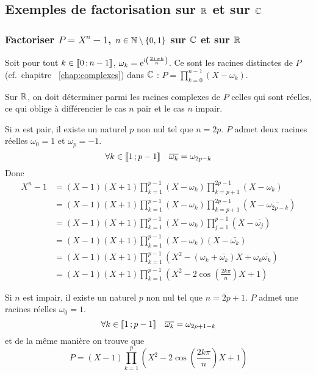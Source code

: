 \subsection{Exemples de factorisation sur \(\mathbb{R}\) et sur \(\mathbb{C}\)}

\subsubsection{Factoriser \(P=X^n-1\), \(n \in \mathbb{N}\setminus\{0,1\}\) sur \(\mathbb{C}\) et sur \(\mathbb{R}\)}

Soit pour tout \(k \in \mathopen{\llbracket}0\mathclose{}\mathpunct{};n-1\mathclose{\rrbracket}\), \(\omega_k = \operatorname{e}^{\operatorname{i}\left(\frac{2\operatorname{i} \pi k}{n}\right)}\). Ce sont les racines distinctes de \(P\) (cf.\ chapitre~
\ref{chap:complexes}) dans \(\mathbb{C}\) : \(P = \prod_{k=0}^{n-1}(X-\omega_k)\).

Sur \(\mathbb{R}\), on doit déterminer parmi les racines complexes de \(P\) celles qui sont réelles, ce qui oblige à différencier le cas \(n\) pair et le cas \(n\) impair.

Si \(n\) est pair, il existe un naturel \(p\) non nul tel que \(n=2p\). \(P\) admet deux racines réelles \(\omega_0=1\) et \(\omega_p=-1\).
\begin{equation}
  \forall k \in \mathopen{\llbracket}1\mathclose{}\mathpunct{};p-1\mathclose{\rrbracket} \quad \overline{\omega_k}=\omega_{2p-k}
\end{equation}
Donc
\begin{align}
  X^n-1 &= (X-1)(X+1) \prod_{k=1}^{p-1} (X-\omega_k)\prod_{k=p+1}^{2p-1} (X-\omega_k) \\
  &=(X-1)(X+1) \prod_{k=1}^{p-1} (X-\omega_k) \prod_{k=p+1}^{2p-1} (X-\bar{\omega_{2p-k}})\\
  &=(X-1)(X+1) \prod_{k=1}^{p-1} (X-\omega_k) \prod_{j=1}^{p-1} (X-\bar{\omega_{j}})\\
  &=(X-1)(X+1) \prod_{k=1}^{p-1} (X-\omega_k)(X-\bar{\omega_{k}})\\
  &=(X-1)(X+1) \prod_{k=1}^{p-1} (X^2-(\omega_k+\bar{\omega_k})X+\omega_k\bar{\omega_k})\\
  &=(X-1)(X+1) \prod_{k=1}^{p-1} \left(X^2-2\cos\left(\frac{2k\pi}{n}\right)X+1\right)
\end{align}

Si \(n\) est impair, il existe un naturel \(p\) non nul tel que \(n=2p+1\). \(P\) admet une racines réelles \(\omega_0=1\).
\begin{equation}
  \forall k \in \mathopen{\llbracket}1\mathclose{}\mathpunct{};p-1\mathclose{\rrbracket} \quad \overline{\omega_k}=\omega_{2p+1-k}
\end{equation}
et de la même manière on trouve que
\begin{equation}
  P=(X-1) \prod_{k=1}^{p} \left(X^2-2\cos\left(\frac{2k\pi}{n}\right)X+1\right)
\end{equation}

